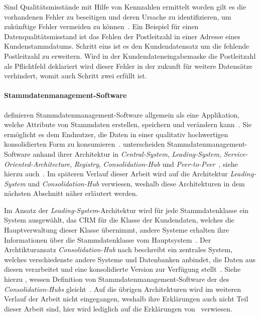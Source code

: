 \documentclass[
  language=german, %
  type=bachelor%
]{isthesis}
\begin{document}
\begin{content}
	Sind Qualitätsmisstände mit Hilfe von Kennzahlen ermittelt worden gilt es die
	vorhandenen Fehler zu beseitigen und deren Ursache zu identifizieren, um
	zukünftige Fehler vermeiden zu können~\cite[][S. 22]{eckerson2002data}. Ein
	Beispiel für einen Datenqualitätsmisstand ist das Fehlen der Postleitzahl in
	einer Adresse eines Kundenstammdatums. Schritt eins ist es den
	Kundendatensatz um die fehlende Postleitzahl zu erweitern. Wird in der
	Kundendateneingabemaske die Postleitzahl als Pflichtfeld deklariert wird
	dieser Fehler in der zukunft für weitere Datensätze verhindert, womit auch
	Schritt zwei erfüllt ist.

	\paragraph{Stammdatenmanagement-Software}
	\textsc{\citeauthor{baghi2014toward}} definieren
	Stammdatenmanagement-Software allgemein als eine Applikation, welche
	Attribute von Stammdaten erstellen, speichern und verändern kann~\cite[][S.
	3828]{baghi2014toward}. Sie
	ermöglicht es dem Endnutzer, die Daten in einer qualitativ hochwertigen
	konsolidierten Form zu konsumieren~\cite[][Abschnitt
	1.2.]{dreibelbis2008enterprise}.  \textsc{\citeauthor{baghi2014toward}}
	unterscheiden Stammdatenmanagement-Software anhand ihrer Architektur in
	\textit{Central-System}, \textit{Leading-System},
	\textit{Service-Oriented-Architecture}, \textit{Registry},
	\textit{Consolidation-Hub} und \textit{Peer-to-Peer}~\cite[][S.
	3829]{baghi2014toward}, siehe hierzu auch~\cite[][Abschnitt
	5.3.1.]{dreibelbis2008enterprise}. Im späteren Verlauf dieser Arbeit wird auf
	die Architektur \textit{Leading-System} und \textit{Consolidation-Hub}
	verwiesen, weshalb diese Architekturen in dem nächsten Abschnitt näher
	erläutert werden.
	
	Im Ansatz der \textit{Leading-System}-Architektur wird für jede
	Stammdatenklasse ein System ausgewählt, \zB{} das \acrshort{CRM} für die
	Klasse der Kundendaten, welches die Hauptverwaltung dieser Klasse übernimmt,
	andere Systeme erhalten ihre Informationen über die Stammdatenklasse vom
	Hauptsystem~\cite[][S. 3829]{baghi2014toward}. Der Archtikturansatz
	\textit{Consolidation-Hub} nach \textsc{\citeauthor{baghi2014toward}}
	beschreibt ein zentrales System, welches verschiedenste andere Systeme und
	Datenbanken anbindet, die Daten aus diesen verarbeitet und eine konsolidierte
	Version zur Verfügung stellt~\cite[][S. 3829]{baghi2014toward}. Siehe hierzu
	\textsc{\citeauthor{loshin2010master}}, wessen Definition von
	Stammdatenmanagement-Software der des \textit{Consolidation-Hubs}
	gleicht~\cite[][S. 8]{loshin2010master}. Auf die übrigen Architekturen wird
	im weiteren Verlauf der Arbeit nicht eingegangen, weshalb ihre Erklärungen
	auch nicht Teil dieser Arbeit sind, hier wird lediglich auf die Erklärungen
	von~\cite{baghi2014toward} verwiesen.



\end{content}
\end{document}
